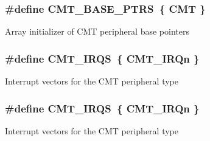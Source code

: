 \subsubsection[{\texorpdfstring{C\+M\+T\+\_\+\+B\+A\+S\+E\+\_\+\+P\+T\+RS}{CMT_BASE_PTRS}}]{\setlength{\rightskip}{0pt plus 5cm}\#define C\+M\+T\+\_\+\+B\+A\+S\+E\+\_\+\+P\+T\+RS~\{ {\bf C\+MT} \}}\hypertarget{group__CMT__Peripheral__Access__Layer_gad58e606f11af35440c1b77ff05b55874}{}\label{group__CMT__Peripheral__Access__Layer_gad58e606f11af35440c1b77ff05b55874}
Array initializer of C\+MT peripheral base pointers 
\subsubsection[{\texorpdfstring{C\+M\+T\+\_\+\+I\+R\+QS}{CMT_IRQS}}]{\setlength{\rightskip}{0pt plus 5cm}\#define C\+M\+T\+\_\+\+I\+R\+QS~\{ {\bf C\+M\+T\+\_\+\+I\+R\+Qn} \}}\hypertarget{group__CMT__Peripheral__Access__Layer_ga6ead37abf997ee35670a9464ae7858bb}{}\label{group__CMT__Peripheral__Access__Layer_ga6ead37abf997ee35670a9464ae7858bb}
Interrupt vectors for the C\+MT peripheral type 
\subsubsection[{\texorpdfstring{C\+M\+T\+\_\+\+I\+R\+QS}{CMT_IRQS}}]{\setlength{\rightskip}{0pt plus 5cm}\#define C\+M\+T\+\_\+\+I\+R\+QS~\{ {\bf C\+M\+T\+\_\+\+I\+R\+Qn} \}}\hypertarget{group__CMT__Peripheral__Access__Layer_ga6ead37abf997ee35670a9464ae7858bb}{}\label{group__CMT__Peripheral__Access__Layer_ga6ead37abf997ee35670a9464ae7858bb}
Interrupt vectors for the C\+MT peripheral type 